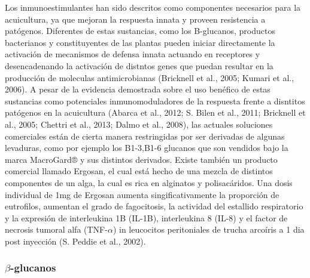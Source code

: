 \documentclass[12pt,a4paper,]{article}
\begin{document}
Los inmunoestimulantes han sido descritos como componentes necesarios
para la acuicultura, ya que mejoran la respuesta innata y proveen
resistencia a patógenos. Diferentes de estas sustancias, como los
B-glucanos, productos bacterianos y constituyentes de las plantas pueden
iniciar directamente la activación de mecanismos de defensa innata
actuando en receptores y desencadenando la activación de distntos genes
que puedan resultar en la producción de moleculas antimicrobianas
(Bricknell et al., 2005; Kumari et al., 2006). A pesar de la evidencia
demostrada sobre el uso benéfico de estas sustancias como potenciales
inmunomoduladores de la respuesta frente a disntitos patógenos en la
acuicultura (Abarca et al., 2012; S. Bilen et al., 2011; Bricknell et
al., 2005; Chettri et al., 2013; Dalmo et al., 2008), las actuales
soluciones comerciales están de cierta manera restringidas por ser
derivadas de algunas levaduras, como por ejemplo los B1-3,B1-6 glucanos
que son vendidos bajo la marca MacroGard® y sus distintos derivados.
Existe también un producto comercial llamado Ergosan, el cual está hecho
de una mezcla de distintos componentes de un alga, la cual es rica en
alginatos y polisacáridos. Una dosis individual de 1mg de Ergosan
aumenta singificativamente la proporción de eutrofilos, aumentan el
grado de fagocitosis, la actividad del estallido respiratorio y la
expresión de interleukina 1B (IL-1B), interleukina 8 (IL-8) y el factor
de necrosis tumoral alfa (TNF-$\alpha$) in leucocitos peritoniales de
trucha arcoíris a 1 dia post inyección (S. Peddie et al., 2002).

\subsubsection{$\beta$-glucanos}\label{beta-glucanos}
\end{document}
